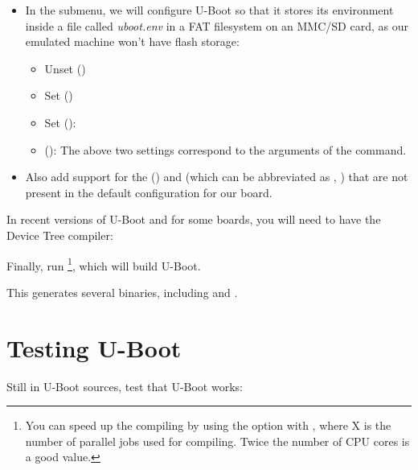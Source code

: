 \begin{itemize}
\item In the  submenu, we will configure U-Boot so
    that it stores its environment inside a file called {\em
    uboot.env} in a FAT filesystem on an MMC/SD card, as our emulated
    machine won't have flash storage:
    \begin{itemize}
    \item Unset  ()
    \item Set  ()
    \item Set  (): 
    \item {} (): \newline
        The above two settings correspond to the arguments of the
         command.
    \end{itemize}
\item Also add support for the  ()
    and  (which can be abbreviated as , )
    that are not present in the default configuration for our board.
\end{itemize}

In recent versions of U-Boot and for some boards, you will
need to have the Device Tree compiler:


Finally, run \footnote{You can speed up the
compiling by using the  option with , where X
is the number of parallel jobs used for compiling. Twice the
number of CPU cores is a good value.}, which will build U-Boot.

This generates several binaries, including  and
.

\section{Testing U-Boot}

Still in U-Boot sources, test that U-Boot works:


